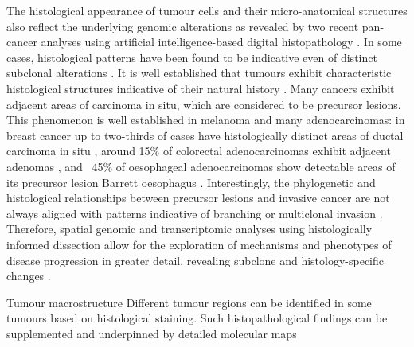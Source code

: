 \label{sec:intro-histology}

The histological appearance of tumour cells and their micro-anatomical structures also reflect the underlying genomic alterations as revealed by two recent pan-cancer analyses using artificial intelligence-based digital histopathology \parencite{Kather2020-bt,Fu2020-cp}. In some cases, histological patterns have been found to be indicative even of distinct subclonal alterations \parencite{Lomakin2022-ks,Coudray2018-jm,Loeffler2022-xj}. It is well established that tumours exhibit characteristic histological structures indicative of their natural history . Many cancers exhibit adjacent areas of carcinoma in situ, which are considered to be precursor lesions. This phenomenon is well established in melanoma \parencite{Nirmal2022-sq} and many adenocarcinomas: in breast cancer up to two-thirds of cases have histologically distinct areas of ductal carcinoma in situ \parencite{Kole2019-hl}, around 15\% of colorectal adenocarcinomas exhibit adjacent adenomas \parencite{Ponz_de_Leon1990-zy}, and ~45\% of oesophageal adenocarcinomas show detectable areas of its precursor lesion Barrett oesophagus \parencite{Sawas2018-mt}. Interestingly, the phylogenetic and histological relationships between precursor lesions and invasive cancer are not always aligned with patterns indicative of branching \parencite{Ross-Innes2015-sq,Stachler2015-ca} or multiclonal invasion \parencite{Casasent2018-gx}. Therefore, spatial genomic and transcriptomic analyses using histologically informed dissection allow for the exploration of mechanisms and phenotypes of disease progression in greater detail, revealing subclone and histology-specific changes \parencite{Lomakin2022-ks}.

    {Tumour macrostructure \parencite{Seferbekova2023-wg}}
    {Different tumour regions can be identified in some tumours based on histological staining. Such histopathological findings can be supplemented and underpinned by detailed molecular maps}


